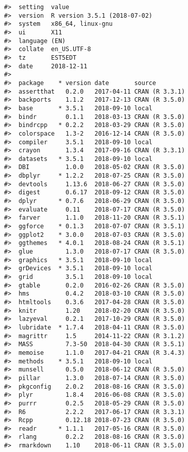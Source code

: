 \documentclass[]{article}
\begin{document}
\begin{verbatim}
#>  setting  value                       
#>  version  R version 3.5.1 (2018-07-02)
#>  system   x86_64, linux-gnu           
#>  ui       X11                         
#>  language (EN)                        
#>  collate  en_US.UTF-8                 
#>  tz       EST5EDT                     
#>  date     2018-12-11                  
#> 
#>  package    * version date       source        
#>  assertthat   0.2.0   2017-04-11 CRAN (R 3.3.1)
#>  backports    1.1.2   2017-12-13 CRAN (R 3.5.0)
#>  base       * 3.5.1   2018-09-10 local         
#>  bindr        0.1.1   2018-03-13 CRAN (R 3.5.0)
#>  bindrcpp   * 0.2.2   2018-03-29 CRAN (R 3.5.0)
#>  colorspace   1.3-2   2016-12-14 CRAN (R 3.5.0)
#>  compiler     3.5.1   2018-09-10 local         
#>  crayon       1.3.4   2017-09-16 CRAN (R 3.3.1)
#>  datasets   * 3.5.1   2018-09-10 local         
#>  DBI          1.0.0   2018-05-02 CRAN (R 3.5.0)
#>  dbplyr     * 1.2.2   2018-07-25 CRAN (R 3.5.0)
#>  devtools     1.13.6  2018-06-27 CRAN (R 3.5.0)
#>  digest       0.6.17  2018-09-12 CRAN (R 3.5.0)
#>  dplyr      * 0.7.6   2018-06-29 CRAN (R 3.5.0)
#>  evaluate     0.11    2018-07-17 CRAN (R 3.5.0)
#>  farver       1.1.0   2018-11-20 CRAN (R 3.5.1)
#>  ggforce    * 0.1.3   2018-07-07 CRAN (R 3.5.1)
#>  ggplot2    * 3.0.0   2018-07-03 CRAN (R 3.5.0)
#>  ggthemes   * 4.0.1   2018-08-24 CRAN (R 3.5.1)
#>  glue         1.3.0   2018-07-17 CRAN (R 3.5.0)
#>  graphics   * 3.5.1   2018-09-10 local         
#>  grDevices  * 3.5.1   2018-09-10 local         
#>  grid         3.5.1   2018-09-10 local         
#>  gtable       0.2.0   2016-02-26 CRAN (R 3.5.0)
#>  hms          0.4.2   2018-03-10 CRAN (R 3.5.0)
#>  htmltools    0.3.6   2017-04-28 CRAN (R 3.5.0)
#>  knitr        1.20    2018-02-20 CRAN (R 3.5.0)
#>  lazyeval     0.2.1   2017-10-29 CRAN (R 3.5.0)
#>  lubridate  * 1.7.4   2018-04-11 CRAN (R 3.5.0)
#>  magrittr     1.5     2014-11-22 CRAN (R 3.1.2)
#>  MASS         7.3-50  2018-04-30 CRAN (R 3.5.1)
#>  memoise      1.1.0   2017-04-21 CRAN (R 3.4.3)
#>  methods    * 3.5.1   2018-09-10 local         
#>  munsell      0.5.0   2018-06-12 CRAN (R 3.5.0)
#>  pillar       1.3.0   2018-07-14 CRAN (R 3.5.0)
#>  pkgconfig    2.0.2   2018-08-16 CRAN (R 3.5.0)
#>  plyr         1.8.4   2016-06-08 CRAN (R 3.5.0)
#>  purrr        0.2.5   2018-05-29 CRAN (R 3.5.0)
#>  R6           2.2.2   2017-06-17 CRAN (R 3.3.1)
#>  Rcpp         0.12.18 2018-07-23 CRAN (R 3.5.0)
#>  readr      * 1.1.1   2017-05-16 CRAN (R 3.5.0)
#>  rlang        0.2.2   2018-08-16 CRAN (R 3.5.0)
#>  rmarkdown    1.10    2018-06-11 CRAN (R 3.5.0)

\end{verbatim}
\end{document}
